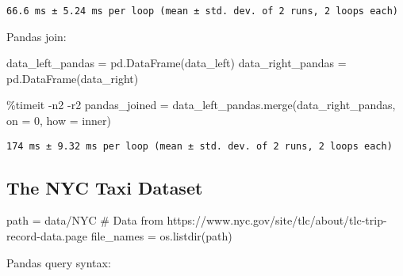 \documentclass[
  letterpaper,
  DIV=11,
  numbers=noendperiod]{scrartcl}
\newenvironment{Shaded}{\begin{snugshade}}{\end{snugshade}}
\newcommand{\CommentTok}[1]{\textcolor[rgb]{0.37,0.37,0.37}{#1}}
\newcommand{\DecValTok}[1]{\textcolor[rgb]{0.68,0.00,0.00}{#1}}
\newcommand{\NormalTok}[1]{\textcolor[rgb]{0.00,0.23,0.31}{#1}}
\newcommand{\OperatorTok}[1]{\textcolor[rgb]{0.37,0.37,0.37}{#1}}
\newcommand{\StringTok}[1]{\textcolor[rgb]{0.13,0.47,0.30}{#1}}
\begin{document}
\begin{verbatim}
66.6 ms ± 5.24 ms per loop (mean ± std. dev. of 2 runs, 2 loops each)
\end{verbatim}

Pandas join:

\begin{Shaded}
\begin{Highlighting}[]
\NormalTok{data\_left\_pandas }\OperatorTok{=}\NormalTok{ pd.DataFrame(data\_left)}
\NormalTok{data\_right\_pandas }\OperatorTok{=}\NormalTok{ pd.DataFrame(data\_right)}

\OperatorTok{\%}\NormalTok{timeit }\OperatorTok{{-}}\NormalTok{n2 }\OperatorTok{{-}}\NormalTok{r2 pandas\_joined }\OperatorTok{=}\NormalTok{ data\_left\_pandas.merge(data\_right\_pandas, on }\OperatorTok{=} \DecValTok{0}\NormalTok{, how }\OperatorTok{=} \StringTok{\textquotesingle{}inner\textquotesingle{}}\NormalTok{)}
\end{Highlighting}
\end{Shaded}

\begin{verbatim}
174 ms ± 9.32 ms per loop (mean ± std. dev. of 2 runs, 2 loops each)
\end{verbatim}

\hypertarget{sec-nyc_taxi}{%
\subsection{The NYC Taxi Dataset}\label{sec-nyc_taxi}}

\begin{Shaded}
\begin{Highlighting}[]
\NormalTok{path }\OperatorTok{=} \StringTok{\textquotesingle{}data/NYC\textquotesingle{}} \CommentTok{\# Data from https://www.nyc.gov/site/tlc/about/tlc{-}trip{-}record{-}data.page}
\NormalTok{file\_names }\OperatorTok{=}\NormalTok{ os.listdir(path)}
\end{Highlighting}
\end{Shaded}

Pandas query syntax:
\end{document}
